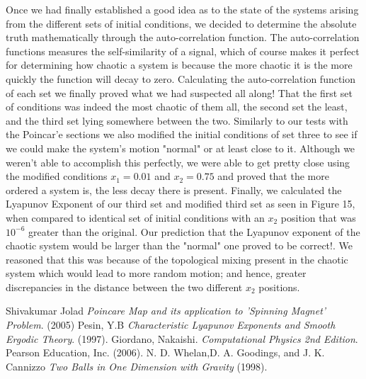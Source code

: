 \documentclass[twocolumn]{article}
\begin{document}
Once we had finally established a good idea as to the state of the systems arising from the different sets of initial conditions, we decided to determine the absolute truth mathematically through the auto-correlation function. The auto-correlation functions measures the self-similarity of a signal, which of course makes it perfect for determining how chaotic a system is because the more chaotic it is the more quickly the function will decay to zero. Calculating the auto-correlation function of each set we finally proved what we had suspected all along! That the first set of conditions was indeed the most chaotic of them all, the second set the least, and the third set lying somewhere between the two. Similarly to our tests with the Poincar'e sections we also modified the initial conditions of set three to see if we could make the system's motion "normal" or at least close to it. Although we weren't able to accomplish this perfectly, we were able to get pretty close using the modified conditions $x_1=0.01$ and $x_2=0.75$ and proved that the more ordered a system is, the less decay there is present. Finally, we calculated the Lyapunov Exponent of our third set and modified third set as seen in Figure 15, when compared to identical set of initial conditions with an $x_2$ position that was $10^{-6}$ greater than the original. Our prediction that the Lyapunov exponent of the chaotic system would be larger than the "normal" one proved to be correct!. We reasoned that this was because of the topological mixing present in the chaotic system which would lead to more random motion; and hence, greater discrepancies in the distance between the two different $x_2$ positions. 
\begin{thebibliography}{9}
Shivakumar Jolad
\textit{Poincare Map and its application to 'Spinning Magnet' Problem}.
(2005)
Pesin, Y.B
\textit{Characteristic Lyapunov Exponents and Smooth Ergodic Theory}. 
(1997).
Giordano, Nakaishi.
\textit{Computational Physics 2nd Edition}. 
Pearson Education, Inc. (2006).
N. D. Whelan,D. A. Goodings, and J. K. Cannizzo
\textit{Two Balls in One Dimension with Gravity}
(1998).
\end{thebibliography}
\end{document}
